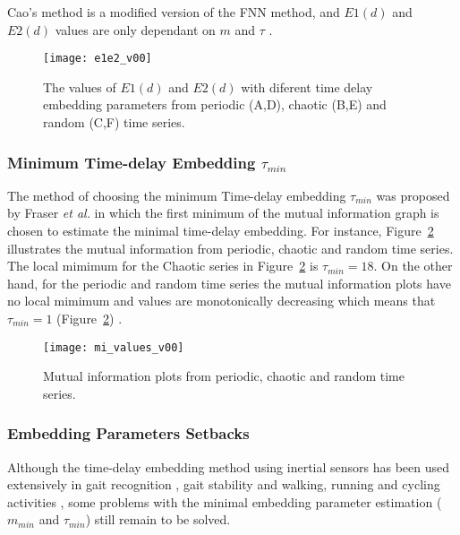 \documentclass[10pt,journal,compsoc]{IEEEtran}
\begin{document}
Cao's method is a modified version of the FNN method, and $E1(d)$ and 
$E2(d)$ values are only dependant on $m$ and $\tau$ \cite{Cao1997}.


\begin{figure}[!htb]
\centering    
 \texttt{[image: e1e2\_v00]}
\caption[PA]{The values of $E1(d)$ and $E2(d)$ with diferent time delay embedding parameters
from periodic (A,D), chaotic (B,E) and random (C,F) time series.}
\label{fig:e1e2}
\end{figure}


\subsubsection{Minimum Time-delay Embedding  $\tau_{min}$}
The method of choosing the minimum Time-delay embedding  $\tau_{min}$ was proposed 
by Fraser \emph{et al.} \cite{Fraser1986} in which the first minimum of the mutual 
information graph is chosen to estimate the minimal time-delay embedding.
For instance, Figure~\ref{fig:mi}  illustrates 
the mutual information from periodic, chaotic and random time series.
The local mimimum for the Chaotic series in Figure~\ref{fig:mi} is $\tau_{min} = 18$.
On the other hand, for the periodic and random time series 
the mutual information plots have no local mimimum 
and values are monotonically decreasing which means that $\tau_{min} = 1$ 
(Figure~\ref{fig:mi}) \cite{Fraser1986}.

\begin{figure}[!htb]
\centering    
 \texttt{[image: mi\_values\_v00]}
\caption[PA]{Mutual information plots from periodic, chaotic and random time series.}
\label{fig:mi}
\end{figure}


\subsubsection{Embedding Parameters Setbacks}
Although the time-delay embedding method using inertial sensors has been used extensively 
in gait recognition \cite{Sama2013}, gait stability \cite{Gouwanda2012} and walking, 
running and cycling activities \cite{Frank2010},
some problems with the minimal embedding parameter estimation  
($m_{min}$ and $\tau_{min}$) still remain to be solved.
\end{document}
